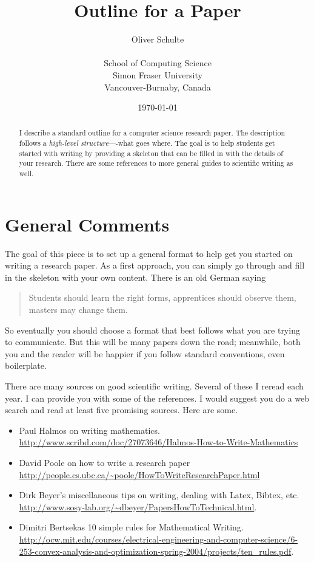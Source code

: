 \documentclass{article}
\begin{document}
\title{Outline for a Paper}
\author{Oliver Schulte\\
\\ School of Computing Science\\ Simon Fraser University\\Vancouver-Burnaby, Canada}
\date{\today}
\maketitle

\begin{abstract}
I describe a standard outline for a computer science research paper. The description follows a {\em high-level structure}----what goes where. The goal is to help students get started with writing by providing a skeleton that can be filled in with the details of your research. There are some references to more general guides to scientific writing as well.
\end{abstract}

\section{General Comments}
The goal of this piece is to set up a general format to help get you started on writing a research paper. As a first approach, you can simply go through and fill in the skeleton with your own content. There is an old German saying

\begin{quote}
Students should learn the right forms, apprentices should observe them, masters may change them.
\end{quote}

So eventually you should choose a format that best follows what you are trying to communicate. But this will be many papers down the road; meanwhile, both you and the reader will be happier if you follow standard conventions, even boilerplate.

There are many sources on good scientific writing. Several of these I reread each year. I can provide you with some of the references. I would suggest you do a web search and read at least five promising sources. Here are some.

\begin{itemize}
\item Paul Halmos on writing mathematics. \url{http://www.scribd.com/doc/27073646/Halmos-How-to-Write-Mathematics}
\item David Poole on how to write a research paper \url{http://people.cs.ubc.ca/~poole/HowToWriteResearchPaper.html}
\item Dirk Beyer's miscellaneous tips on writing, dealing with Latex, Bibtex, etc. \url{http://www.sosy-lab.org/~dbeyer/PapersHowToTechnical.html}.
\item Dimitri Bertsekas 10 simple rules for Mathematical Writing. \url{http://ocw.mit.edu/courses/electrical-engineering-and-computer-science/6-253-convex-analysis-and-optimization-spring-2004/projects/ten_rules.pdf}.
\end{itemize}
\end{document}
